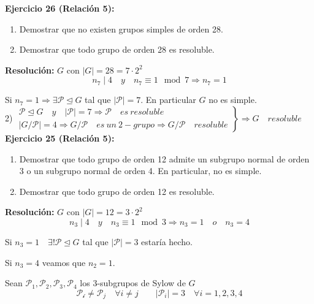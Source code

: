 \documentclass{article}
\begin{document}
\textbf{Ejercicio 26 (Relación 5):}\begin{enumerate}[1)]
\item Demostrar que no existen grupos simples de orden 28.

\item Demostrar que todo grupo de orden 28 es resoluble.
\end{enumerate}

\textbf{Resolución:} $G$ con $|G|=28=7\cdot 2^2$
\begin{equation*}
n_7\mid 4\quad y \quad n_7\equiv 1\mod{7} \Rightarrow n_7=1
\end{equation*}

Si $n_7=1\Rightarrow \exists\mathcal{P}\unlhd G$ tal que $|\mathcal{P}|=7$. En particular $G$ no es simple. \\

2) $\left. \begin{array}{c}
\mathcal{P}\unlhd G\quad y\quad |\mathcal{P}|=7\Rightarrow \mathcal{P} \quad es\:resoluble\\
|G/\mathcal{P}|=4\Rightarrow G/\mathcal{P}\quad es\:un\:2-grupo\Rightarrow G/\mathcal{P}\quad resoluble
\end{array} \right\rbrace \Rightarrow G\quad resoluble$ \\

\textbf{Ejercicio 25 (Relación 5):} \begin{enumerate}[1)]
\item Demostrar que todo grupo de orden 12 admite un subgrupo normal de orden 3 o un subgrupo normal de orden 4. En particular, no es simple. 

\item Demostrar que todo grupo de orden 12 es resoluble.
\end{enumerate}

\textbf{Resolución:} $G$ con $|G|=12=3\cdot 2^2$
\begin{equation*}
n_3\mid 4\quad y\quad n_3\equiv 1\mod{3} \Rightarrow n_3=1\quad o\quad n_3=4
\end{equation*}

Si $n_3=1\quad \exists!\mathcal{P}\unlhd G$ tal que $|\mathcal{P}|=3$ estaría hecho.

Si $n_3=4$ veamos que $n_2=1$.

Sean $\mathcal{P}_1,\mathcal{P}_2,\mathcal{P}_3,\mathcal{P}_4$ los 3-subgrupos de Sylow de $G$
\begin{equation*}
\mathcal{P_i}\neq \mathcal{P}_j \quad \forall i\neq j\qquad |\mathcal{P}_i|=3\quad \forall i=1,2,3,4
\end{equation*}
\end{document}
